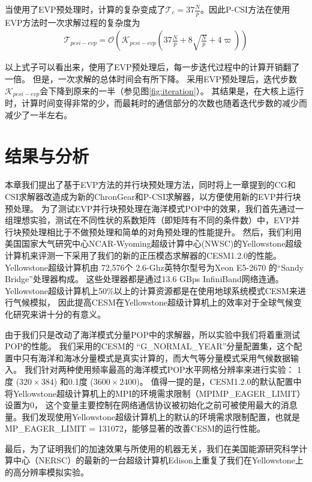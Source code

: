 当使用了EVP预处理时，计算的复杂变成了$\mathcal{T}_c = 37 \frac{N}{p}$。因此P-CSI方法在使用EVP方法时一次求解过程的复杂度为
\begin{eqnarray}
\label{t_pcsiEvp}
\mathcal{T}_{pcsi-evp}=\mathcal{O}(\mathcal{K}_{pcsi-evp} (37\frac{N}{p} +8\sqrt{\frac{N }{p}} + 4\varpi))
\end{eqnarray}

以上式子可以看出来，使用了EVP预处理后，每一步迭代过程中的计算开销翻了一倍。
但是，一次求解的总体时间会有所下降。 
采用EVP预处理后，迭代步数$\mathcal{K}_{pcsi-evp}$会下降到原来的一半（参见图\ref{fig:iteration}）。
其结果是，在大核上运行时，计算时间变得非常的少，而最耗时的通信部分的次数也随着迭代步数的减少而减少了一半左右。



\section{结果与分析}
\label{precond:exp}


本章我们提出了基于EVP方法的并行块预处理方法，同时将上一章提到的CG和CSI求解器改造成为新的ChronGear和P-CSI求解器，以方便使用新的EVP并行块预处理。
为了测试EVP并行块预处理在海洋模式POP中的效果，我们首先通过一组理想实验，测试在不同性状的系数矩阵（即矩阵有不同的条件数）中，EVP并行块预处理相比于不做预处理和简单的对角预处理的性能提升。
然后，我们利用美国国家大气研究中心NCAR-Wyoming超级计算中心(NWSC)\cite{loft:2015}的Yellowstone超级计算机来评测一下采用了我们的新的正压模态求解器的CESM1.2.0的性能。 
Yellowstone超级计算机由 72,576个
2.6-Ghz英特尔型号为Xeon E5-2670 的“Sandy Bridge”处理器构成。 
这些处理器都是通过13.6 GBps InfiniBand网络连通。   
Yellowstone超级计算机上50\%以上的计算资源都是在使用地球系统模式CESM来进行气候模拟， 
因此提高CESM在Yellowstone超级计算机上的效率对于全球气候变化研究来讲十分的有意义\cite{wf2014}。 


由于我们只是改动了海洋模式分量POP中的求解器，所以实验中我们将着重测试POP的性能。 
我们采用的CESM的
“G\_NORMAL\_YEAR”分量配置集，这个配置中只有海洋和海冰分量模式是真实计算的，而大气等分量模式采用气候数据输入。
我们针对两种使用频率最高的海洋模式POP水平网格分辨率来进行实验：
1度 ($320\times 384$) 和0.1度 ($3600\times 2400$)。
值得一提的是，CESM1.2.0的默认配置中将Yellowstone超级计算机上的MPI的环境需求限制（MPIMP\_EAGER\_LIMIT）设置为0， 这个变量主要控制在网络通信协议被初始化之前可被使用最大的消息量。我们发现使用Yellowstone超级计算机上的默认的环境需求限制配置，也就是MP\_EAGER\_LIMIT = 131072，能够显著的改善CESM的运行性能。 

最后，为了证明我们的加速效果与所使用的机器无关，我们在美国能源研究科学计算中心（NERSC）的最新的一台超级计算机Edison上重复了我们在Yellowstone上的高分辨率模拟实验。



